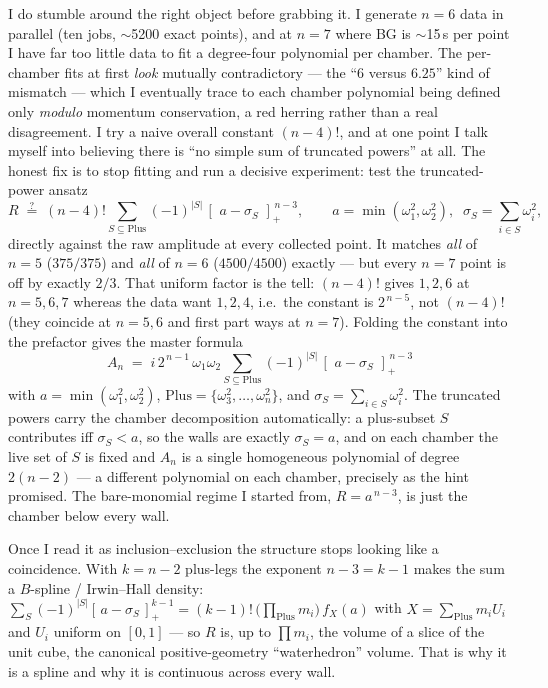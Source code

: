 \documentclass{article}
\newcommand{\pp}[1]{\left[\,#1\,\right]_{+}}
\begin{document}
I do stumble around the right object before grabbing it. I generate $n=6$ data in
parallel (ten jobs, $\sim$5200 exact points), and at $n=7$ where BG is
$\sim$15\,s per point I have far too little data to fit a degree-four polynomial
per chamber. The per-chamber fits at first \emph{look} mutually contradictory ---
the ``$6$ versus $6.25$'' kind of mismatch --- which I eventually trace to each
chamber polynomial being defined only \emph{modulo} momentum conservation, a red
herring rather than a real disagreement. I try a naive overall constant
$(n-4)!$, and at one point I talk myself into believing there is ``no simple sum
of truncated powers'' at all. The honest fix is to stop fitting and run a
decisive experiment: test the truncated-power ansatz
\[
R \;\stackrel{?}{=}\; (n-4)!\sum_{S\subseteq\mathrm{Plus}}(-1)^{|S|}\,
\pp{\,a-\sigma_S\,}^{\,n-3},\qquad
a=\min(\omega_1^2,\omega_2^2),\;\;\sigma_S=\sum_{i\in S}\omega_i^2,
\]
directly against the raw amplitude at every collected point. It matches
\emph{all} of $n=5$ ($375/375$) and \emph{all} of $n=6$ ($4500/4500$) exactly ---
but every $n=7$ point is off by exactly $2/3$. That uniform factor is the tell:
$(n-4)!$ gives $1,2,6$ at $n=5,6,7$ whereas the data want $1,2,4$, i.e.\ the
constant is $2^{\,n-5}$, not $(n-4)!$ (they coincide at $n=5,6$ and first part
ways at $n=7$). Folding the constant into the prefactor gives the master formula
\[
\boxed{\;
A_n \;=\; i\,2^{\,n-1}\,\omega_1\omega_2
\sum_{S\subseteq\mathrm{Plus}}(-1)^{|S|}\,
\pp{\,a-\sigma_S\,}^{\,n-3}\;}
\]
with $a=\min(\omega_1^2,\omega_2^2)$, $\mathrm{Plus}=\{\omega_3^2,\dots,
\omega_n^2\}$, and $\sigma_S=\sum_{i\in S}\omega_i^2$. The truncated powers carry
the chamber decomposition automatically: a plus-subset $S$ contributes iff
$\sigma_S<a$, so the walls are exactly $\sigma_S=a$, and on each chamber the live
set of $S$ is fixed and $A_n$ is a single homogeneous polynomial of degree
$2(n-2)$ --- a different polynomial on each chamber, precisely as the hint
promised. The bare-monomial regime I started from, $R=a^{\,n-3}$, is just the
chamber below every wall.

Once I read it as inclusion--exclusion the structure stops looking like a
coincidence. With $k=n-2$ plus-legs the exponent $n-3=k-1$ makes the sum a
$B$-spline / Irwin--Hall density: $\sum_S(-1)^{|S|}\pp{a-\sigma_S}^{k-1}=
(k-1)!\,\big(\prod_{\mathrm{Plus}}m_i\big)\,f_X(a)$ with $X=\sum_{\mathrm{Plus}}
m_iU_i$ and $U_i$ uniform on $[0,1]$ --- so $R$ is, up to $\prod m_i$, the volume
of a slice of the unit cube, the canonical positive-geometry ``waterhedron''
volume. That is why it is a spline and why it is continuous across every wall.
\end{document}
